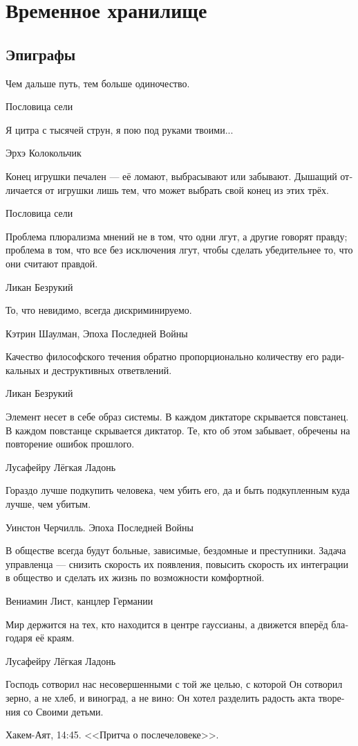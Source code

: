 \documentclass[a4paper,12pt,fleqn]{book}\usepackage{polyglossia}\setdefaultlanguage[babelshorthands=true]{russian}\setotherlanguage{english}\defaultfontfeatures{Ligatures=TeX,Mapping=tex-text}\usepackage{xcolor}\newcommand{\ml}[3]{#2}
\begin{document}
{\part{Временное хранилище}

\chapter{Эпиграфы}

\epigraph{
\ml{$0$}
{Чем дальше путь, тем больше одиночество.}
{The longer the way, the lonelier the way.}
}{Пословица сели}

\epigraph{Я цитра с тысячей струн, я пою под руками твоими...}
{Эрхэ Колокольчик}

\epigraph{
Конец игрушки печален --- её ломают, выбрасывают или забывают.
Дышащий отличается от игрушки лишь тем, что может выбрать свой конец из этих трёх.
}{
Пословица сели
}

\epigraph
{Проблема плюрализма мнений не в том, что одни лгут, а другие говорят правду;
проблема в том, что все без исключения лгут, чтобы сделать убедительнее то, что они считают правдой.}
{Ликан Безрукий}

\epigraph{
\ml{$0$}
{То, что невидимо, всегда дискриминируемо.}
{Invisible is always discriminated.}
}{
\ml{$0$}
{Кэтрин Шаулман, Эпоха Последней Войны}
{Catherine Shoulmann}}

\epigraph
{Качество философского течения обратно пропорционально количеству его радикальных и деструктивных ответвлений.}
{Ликан Безрукий}

\epigraph
{Элемент несет в себе образ системы.
В каждом диктаторе скрывается повстанец.
В каждом повстанце скрывается диктатор.
Те, кто об этом забывает, обречены на повторение ошибок прошлого.}
{Лусафейру Лёгкая Ладонь}

\epigraph
{Гораздо лучше подкупить человека, чем убить его, да и быть подкупленным куда лучше, чем убитым.}
{Уинстон Черчилль.
Эпоха Последней Войны}

\epigraph
{В обществе всегда будут больные, зависимые, бездомные и преступники.
Задача управленца --- снизить скорость их появления, повысить скорость их интеграции в общество и сделать их жизнь по возможности комфортной.}
{Вениамин Лист, канцлер Германии}

\epigraph
{Мир держится на тех, кто находится в центре гауссианы, а движется вперёд благодаря её краям.}
{Лусафейру Лёгкая Ладонь}

\epigraph
{Господь сотворил нас несовершенными с той же целью, с которой Он сотворил зерно, а не хлеб, и виноград, а не вино: Он хотел разделить радость акта творения со Своими детьми.}
{Хакем-Аят, 14:45.
<<Притча о послечеловеке>>.}

}
\end{document}
